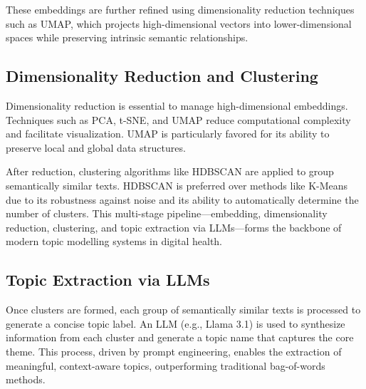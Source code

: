 These embeddings are further refined using dimensionality reduction techniques such as UMAP, which projects high-dimensional vectors into lower-dimensional spaces while preserving intrinsic semantic relationships.

\subsection{Dimensionality Reduction and Clustering}
Dimensionality reduction is essential to manage high-dimensional embeddings. Techniques such as PCA, t-SNE, and UMAP reduce computational complexity and facilitate visualization. UMAP is particularly favored for its ability to preserve local and global data structures.

After reduction, clustering algorithms like HDBSCAN are applied to group semantically similar texts. HDBSCAN is preferred over methods like K-Means due to its robustness against noise and its ability to automatically determine the number of clusters. This multi-stage pipeline—embedding, dimensionality reduction, clustering, and topic extraction via LLMs—forms the backbone of modern topic modelling systems in digital health.

\subsection{Topic Extraction via LLMs}
Once clusters are formed, each group of semantically similar texts is processed to generate a concise topic label. An LLM (e.g., Llama 3.1) is used to synthesize information from each cluster and generate a topic name that captures the core theme. This process, driven by prompt engineering, enables the extraction of meaningful, context-aware topics, outperforming traditional bag-of-words methods.

